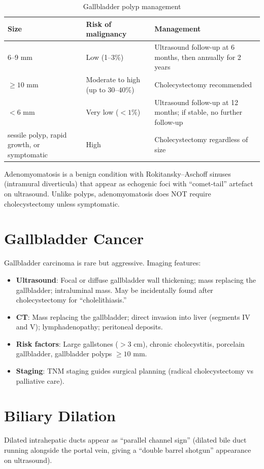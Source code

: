\begin{table}[h]
\centering
\caption{Gallbladder polyp management}
\begin{tabular}{p{3cm} p{4cm} p{4cm}}
\hline
\textbf{Size} & \textbf{Risk of malignancy} & \textbf{Management} \\
\hline
6--9 mm & Low (1--3\%) & Ultrasound follow-up at 6 months, then annually for 2 years \\
$\geq 10$ mm & Moderate to high (up to 30--40\%) & Cholecystectomy recommended \\
$< 6$ mm & Very low ($< 1\%$) & Ultrasound follow-up at 12 months; if stable, no further follow-up \\
 sessile polyp, rapid growth, or symptomatic & High & Cholecystectomy regardless of size \\
\hline
\end{tabular}
\end{table}

\begin{pearlbox}
Adenomyomatosis is a benign condition with Rokitansky--Aschoff sinuses (intramural diverticula) that appear as echogenic foci with ``comet-tail'' artefact on ultrasound. Unlike polyps, adenomyomatosis does NOT require cholecystectomy unless symptomatic.
\end{pearlbox}


\section{Gallbladder Cancer}
Gallbladder carcinoma is rare but aggressive. Imaging features:
\begin{itemize}
  \item \textbf{Ultrasound}: Focal or diffuse gallbladder wall thickening; mass replacing the gallbladder; intraluminal mass. May be incidentally found after cholecystectomy for ``cholelithiasis.''
  \item \textbf{CT}: Mass replacing the gallbladder; direct invasion into liver (segments IV and V); lymphadenopathy; peritoneal deposits.
  \item \textbf{Risk factors}: Large gallstones ($> 3$ cm), chronic cholecystitis, porcelain gallbladder, gallbladder polyps $\geq 10$ mm.
  \item \textbf{Staging}: TNM staging guides surgical planning (radical cholecystectomy vs palliative care).
\end{itemize}


\section{Biliary Dilation}
Dilated intrahepatic ducts appear as ``parallel channel sign'' (dilated bile duct running alongside the portal vein, giving a ``double barrel shotgun'' appearance on ultrasound).

